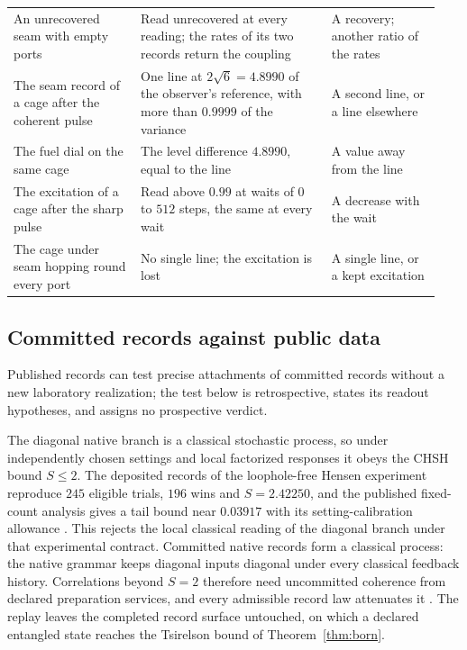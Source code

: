 \documentclass[11pt]{article}
\theoremstyle{definition}
\theoremstyle{remark}
\begin{document}
{\begin{longtable}{@{}L{0.28\linewidth}L{0.42\linewidth}L{0.24\linewidth}@{}}
An unrecovered seam with empty ports & Read unrecovered at every reading;
the rates of its two records return the coupling & A recovery; another
ratio of the rates\\
The seam record of a cage after the coherent pulse & One line at
$2\sqrt6=4.8990$ of the observer's reference, with more than $0.9999$ of
the variance & A second line, or a line elsewhere\\
The fuel dial on the same cage & The level difference $4.8990$, equal to the
line & A value away from the line\\
The excitation of a cage after the sharp pulse & Read above $0.99$ at waits
of $0$ to $512$ steps, the same at every wait & A decrease with the wait\\
The cage under seam hopping round every port & No single line; the
excitation is lost & A single line, or a kept excitation\\
\bottomrule
\end{longtable}
}

\subsection{Committed records against public data}
\label{sec:public-records}

Published records can test precise attachments of committed records without a
new laboratory realization; the test below is retrospective, states its
readout hypotheses, and assigns no prospective verdict.

The diagonal native branch is a classical stochastic process, so under
independently chosen settings and local factorized responses it obeys the
CHSH bound $S\le2$. The deposited records of the loophole-free Hensen
experiment \cite{hensen2015} reproduce $245$ eligible trials, $196$ wins and
$S=2.42250$, and the published fixed-count analysis gives a tail bound near
$0.03917$ with its setting-calibration allowance \cite{ophbell}. This
rejects the local classical reading of the diagonal branch under that
experimental contract. Committed native records form a classical process:
the native grammar keeps diagonal inputs diagonal under every classical
feedback history. Correlations beyond
$S=2$ therefore need uncommitted coherence from declared preparation
services, and every admissible record law attenuates it \cite{ophrecordlaws}.
The replay leaves the completed record
surface untouched, on which a declared entangled state reaches the
Tsirelson bound of Theorem~\ref{thm:born}.
\end{document}
